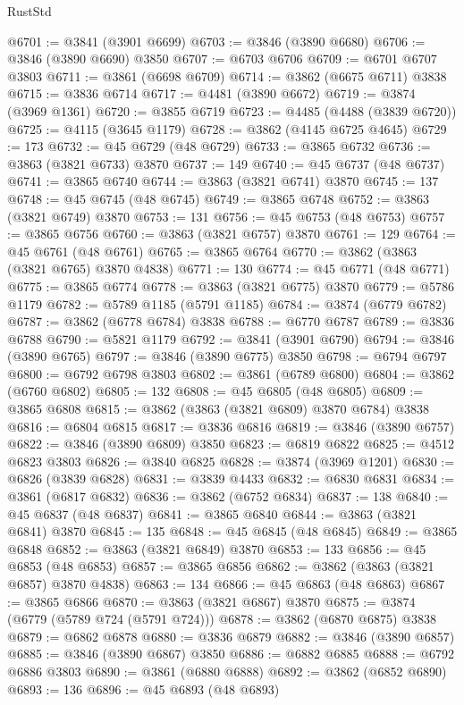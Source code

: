 \begin{lexlean}{RustStd}
\begin{coremodule}
@6701 := @3841 (@3901 @6699)
@6703 := @3846 (@3890 @6680)
@6706 := @3846 (@3890 @6690) @3850
@6707 := @6703 @6706
@6709 := @6701 @6707 @3803
@6711 := @3861 (@6698 @6709)
@6714 := @3862 (@6675 @6711) @3838
@6715 := @3836 @6714
@6717 := @4481 (@3890 @6672)
@6719 := @3874 (@3969 @1361)
@6720 := @3855 @6719
@6723 := @4485 (@4488 (@3839 @6720))
@6725 := @4115 (@3645 @1179)
@6728 := @3862 (@4145 @6725 @4645)
@6729 := 173
@6732 := @45 @6729 (@48 @6729)
@6733 := @3865 @6732
@6736 := @3863 (@3821 @6733) @3870
@6737 := 149
@6740 := @45 @6737 (@48 @6737)
@6741 := @3865 @6740
@6744 := @3863 (@3821 @6741) @3870
@6745 := 137
@6748 := @45 @6745 (@48 @6745)
@6749 := @3865 @6748
@6752 := @3863 (@3821 @6749) @3870
@6753 := 131
@6756 := @45 @6753 (@48 @6753)
@6757 := @3865 @6756
@6760 := @3863 (@3821 @6757) @3870
@6761 := 129
@6764 := @45 @6761 (@48 @6761)
@6765 := @3865 @6764
@6770 := @3862 (@3863 (@3821 @6765) @3870 @4838)
@6771 := 130
@6774 := @45 @6771 (@48 @6771)
@6775 := @3865 @6774
@6778 := @3863 (@3821 @6775) @3870
@6779 := @5786 @1179
@6782 := @5789 @1185 (@5791 @1185)
@6784 := @3874 (@6779 @6782)
@6787 := @3862 (@6778 @6784) @3838
@6788 := @6770 @6787
@6789 := @3836 @6788
@6790 := @5821 @1179
@6792 := @3841 (@3901 @6790)
@6794 := @3846 (@3890 @6765)
@6797 := @3846 (@3890 @6775) @3850
@6798 := @6794 @6797
@6800 := @6792 @6798 @3803
@6802 := @3861 (@6789 @6800)
@6804 := @3862 (@6760 @6802)
@6805 := 132
@6808 := @45 @6805 (@48 @6805)
@6809 := @3865 @6808
@6815 := @3862 (@3863 (@3821 @6809) @3870 @6784) @3838
@6816 := @6804 @6815
@6817 := @3836 @6816
@6819 := @3846 (@3890 @6757)
@6822 := @3846 (@3890 @6809) @3850
@6823 := @6819 @6822
@6825 := @4512 @6823 @3803
@6826 := @3840 @6825
@6828 := @3874 (@3969 @1201)
@6830 := @6826 (@3839 @6828)
@6831 := @3839 @4433
@6832 := @6830 @6831
@6834 := @3861 (@6817 @6832)
@6836 := @3862 (@6752 @6834)
@6837 := 138
@6840 := @45 @6837 (@48 @6837)
@6841 := @3865 @6840
@6844 := @3863 (@3821 @6841) @3870
@6845 := 135
@6848 := @45 @6845 (@48 @6845)
@6849 := @3865 @6848
@6852 := @3863 (@3821 @6849) @3870
@6853 := 133
@6856 := @45 @6853 (@48 @6853)
@6857 := @3865 @6856
@6862 := @3862 (@3863 (@3821 @6857) @3870 @4838)
@6863 := 134
@6866 := @45 @6863 (@48 @6863)
@6867 := @3865 @6866
@6870 := @3863 (@3821 @6867) @3870
@6875 := @3874 (@6779 (@5789 @724 (@5791 @724)))
@6878 := @3862 (@6870 @6875) @3838
@6879 := @6862 @6878
@6880 := @3836 @6879
@6882 := @3846 (@3890 @6857)
@6885 := @3846 (@3890 @6867) @3850
@6886 := @6882 @6885
@6888 := @6792 @6886 @3803
@6890 := @3861 (@6880 @6888)
@6892 := @3862 (@6852 @6890)
@6893 := 136
@6896 := @45 @6893 (@48 @6893)

\end{coremodule}
\end{lexlean}
